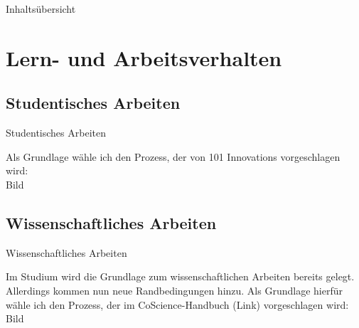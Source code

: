 \documentclass[absolute, overlay]{TIBbeamer}
\title{}
\author{Mila Runnwerth}
\date{}
\begin{document}

\begin{frame}
\titlepage
\end{frame}


\begin{frame}{Inhalts\"ubersicht}
\thispagestyle{empty}
\tableofcontents
\end{frame}


\section{Lern- und Arbeitsverhalten}

\subsection{Studentisches Arbeiten}


\begin{frame}{Studentisches Arbeiten}

Als Grundlage w\"ahle ich den Prozess, der von 101 Innovations vorgeschlagen wird: \\

Bild

\end{frame}


\subsection{Wissenschaftliches Arbeiten}


\begin{frame}{Wissenschaftliches Arbeiten}

Im Studium wird die Grundlage zum wissenschaftlichen Arbeiten bereits gelegt. Allerdings kommen nun neue Randbedingungen hinzu. Als Grundlage hierf\"ur w\"ahle ich den Prozess, der im CoScience-Handbuch (Link) vorgeschlagen wird: \\

Bild

\end{frame}

\end{document}

